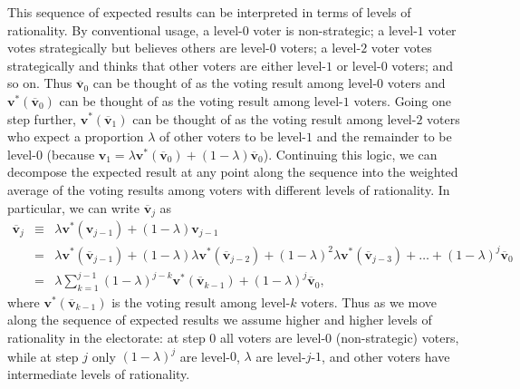 \documentclass[11pt,a4paper]{article}
\begin{document}
This sequence of expected results can be interpreted in terms of levels of rationality. By conventional usage, a level-$0$ voter is non-strategic; a level-$1$ voter votes strategically but believes others are level-$0$ voters; a level-$2$ voter votes strategically and thinks that other voters are either level-$1$ or level-$0$ voters; and so on. Thus  $\overline{\mathbf{v}}_0$ can be thought of as the voting result among level-$0$ voters and $\textbf{v}^*(\overline{\textbf{v}}_0)$ can be thought of as the voting result among level-$1$ voters. %
Going one step further, $\textbf{v}^*(\overline{\textbf{v}}_1)$ can be thought of as the voting result among level-$2$ voters who expect a proportion $\lambda$ of other voters to be level-$1$ and the remainder to be level-$0$ (because $\mathbf{v}_1 = \lambda \textbf{v}^*(\overline{\textbf{v}}_0) + (1-\lambda)\overline{\textbf{v}}_0$). Continuing this logic, we can decompose the expected result at any point along the sequence into the weighted average of the voting results among voters with different levels of rationality. In particular, we can write $\overline{\textbf{v}}_j$ as  
\begin{eqnarray} 
\overline{\textbf{v}}_j &\equiv& \lambda \mathbf{v}^*(\mathbf{v}_{j-1}) + (1 - \lambda) \textbf{v}_{j-1}  \nonumber \\ 
 &=& \lambda \mathbf{v}^*(\overline{\mathbf{v}}_{j-1}) + (1 - \lambda) \lambda \mathbf{v}^*(\overline{\mathbf{v}}_{j-2}) + (1 - \lambda)^2 \lambda \mathbf{v}^*(\overline{\mathbf{v}}_{j-3}) + \ldots + (1 - \lambda)^j \overline{\textbf{v}}_0 \nonumber \\
 &=& \lambda \sum_{k = 1}^{j-1} (1 - \lambda)^{j -k} \mathbf{v}^*(\overline{\mathbf{v}}_{k-1}) + (1 - \lambda)^j \overline{\textbf{v}}_0, \nonumber 
\end{eqnarray}
where $\mathbf{v}^*(\overline{\mathbf{v}}_{k-1})$ is the voting result among level-$k$ voters. Thus as we move along the sequence of expected results we assume higher and higher levels of rationality in the electorate: at step 0 all voters are level-$0$ (non-strategic) voters, while at step $j$ only $(1 - \lambda)^j$ are level-$0$, $\lambda$ are level-$j$-$1$, and other voters have intermediate levels of rationality. 
\end{document}
